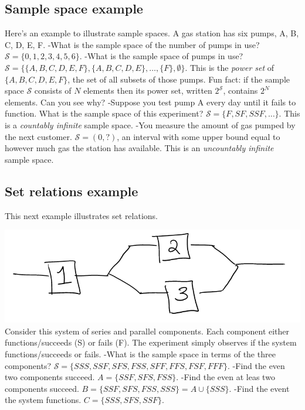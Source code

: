 \documentclass[]{book}
\begin{document}
\subsection{Sample space example}\label{sample-space-example}

Here's an example to illustrate sample spaces. A gas station has six
pumps, A, B, C, D, E, F. -What is the sample space of the number of
pumps in use? \(\mathcal{S} =\{0,1,2,3,4,5,6\}\). -What is the sample
space of pumps in use?
\(\mathcal{S} = \{\{A,B,C,D,E,F\},\{A,B,C,D,E\}, \ldots,\{F\}, \emptyset \}\).
This is the \emph{power set} of \(\{A,B,C,D,E,F\}\), the set of all
subsets of those pumps. Fun fact: if the sample space \(\mathcal{S}\)
consists of \(N\) elements then its power set, written
\(2^{\mathcal{S}}\), contains \(2^N\) elements. Can you see why?
-Suppose you test pump A every day until it fails to function. What is
the sample space of this experiment?
\(\mathcal{S} = \{F, SF, SSF, \ldots \}\). This is a \emph{countably
infinite} sample space. -You measure the amount of gas pumped by the
next customer. \(\mathcal{S} = (0, ?)\), an interval with some upper
bound equal to however much gas the station has available. This is an
\emph{uncountably infinite} sample space.

\subsection{Set relations example}\label{set-relations-example}

This next example illustrates set relations.

\includegraphics[width=11in]{system} Consider this system of series and
parallel components. Each component either functions/succeeds (S) or
fails (F). The experiment simply observes if the system
functions/succeeds or fails. -What is the sample space in terms of the
three components?
\(\mathcal{S} = \{SSS, SSF, SFS, FSS, SFF, FFS, FSF, FFF\}\). -Find the
even two components succeed. \(A = \{SSF, SFS, FSS\}\). -Find the even
at leas two components succeed.
\(B = \{SSF, SFS, FSS, SSS\} = A\cup \{SSS\}\). -Find the event the
system functions. \(C = \{SSS, SFS, SSF\}\).
\end{document}
